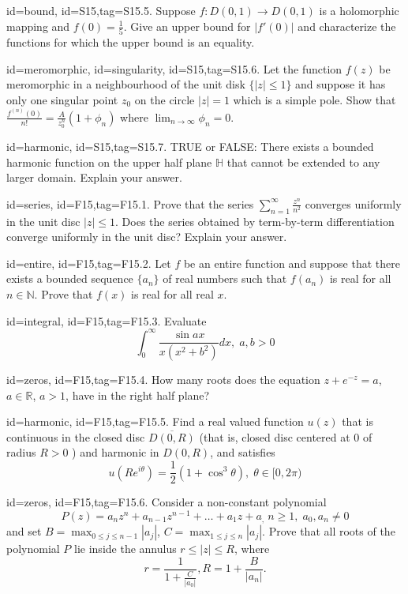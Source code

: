 \documentclass[12pt,letterpaper]{article}
\theoremstyle{plain}
\theoremstyle{definition}
\begin{document}
{\item[id=bound, id=S15,tag=S15.5.]
Suppose $f : D(0,1) \rightarrow D(0,1)$ is a holomorphic mapping and $f(0) = \frac{1}{5}$. Give an upper bound for $| f'(0) |$ and characterize the functions for which the upper bound is an equality.

\item[id=meromorphic, id=singularity, id=S15,tag=S15.6.]
Let the function $f(z)$ be meromorphic in a neighbourhood of the unit disk $\{| z | \le 1\}$ and suppose it has only one singular point $z_0$ on the circle $| z | = 1$ which is a simple pole. Show that $\frac{f^{(n)}(0)}{n!} = \frac{A}{z_0^n}(1 + \phi_n)$ where $\lim_{n\rightarrow \infty} \phi_n = 0$.

\item[id=harmonic, id=S15,tag=S15.7.]
TRUE or FALSE: There exists a bounded harmonic function on the upper half plane $\mathbb{H}$ that cannot be extended to any larger domain. Explain your answer.

\item[id=series, id=F15,tag=F15.1.]
Prove that the series $\sum_{n=1}^{\infty} \frac{z^n}{n^2}$ converges uniformly in the unit disc $| z | \le 1$. Does the series obtained by term-by-term differentiation converge uniformly in the unit disc? Explain your answer.
\item[id=entire, id=F15,tag=F15.2.]
Let $f$ be an entire function and suppose that there exists a bounded sequence $\{a_n\}$ of real numbers such that $f(a_n)$ is real for all $n \in \mathbb{N}$. Prove that $f(x)$ is real for all real $x$.
\item[id=integral, id=F15,tag=F15.3.]
Evaluate
\[
	\int_{0}^{\infty} \frac{\sin ax}{x(x^2 + b^2)} dx, \; a,b > 0
\]

\item[id=zeros, id=F15,tag=F15.4.]
How many roots does the equation $z + e^{-z} = a$, $a \in \mathbb{R}$, $a > 1$, have in the right half plane?

\item[id=harmonic, id=F15,tag=F15.5.]
Find a real valued function $u(z)$ that is continuous in the closed disc $\overline{D(0,R)}$ (that is, closed disc centered at 0 of radius $R > 0$ ) and harmonic in $D(0,R)$, and satisfies
\[
	u(Re^{i\theta}) = \frac{1}{2}(1 + \cos^3\theta), \; \theta \in [0,2\pi)
\]
\item[id=zeros, id=F15,tag=F15.6.]
Consider a non-constant polynomial
\[
	P(z) = a_n z^n + a_{n-1} z^{n-1} + \ldots + a_1 z + a_, \; n \ge 1, \; a_0, a_n \ne 0
\]
and set $B = \max_{0 \le j \le n - 1} | a_j |$, $C = \max_{1 \le j \le n} | a_j |$. Prove that all roots of the polynomial $P$ lie inside the annulus $r \le | z | \le R$, where
\[
	r = \frac{1}{1 + \frac{C}{| a_0 |}}, R = 1 + \frac{B}{| a_n |}.
\]

}
\end{document}
